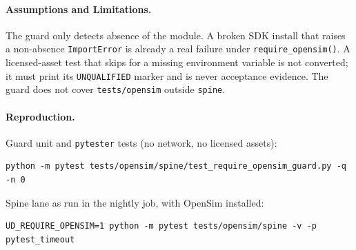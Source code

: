 \paragraph{Assumptions and Limitations.} The guard only detects absence of the
module. A broken SDK install that raises a non-absence \texttt{ImportError} is
already a real failure under \texttt{require\_opensim()}. A licensed-asset test
that skips for a missing environment variable is not converted; it must print
its \texttt{UNQUALIFIED} marker and is never acceptance evidence. The guard
does not cover \texttt{tests/opensim} outside \texttt{spine}.

\paragraph{Reproduction.} Guard unit and \texttt{pytester} tests (no network,
no licensed assets):
\begin{verbatim}
python -m pytest tests/opensim/spine/test_require_opensim_guard.py -q -n 0
\end{verbatim}
Spine lane as run in the nightly job, with OpenSim installed:
\begin{verbatim}
UD_REQUIRE_OPENSIM=1 python -m pytest tests/opensim/spine -v -p pytest_timeout
\end{verbatim}
